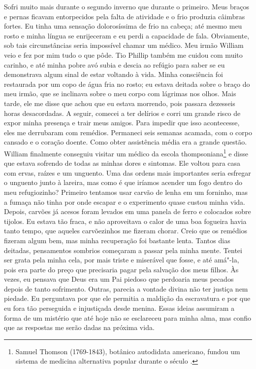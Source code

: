 Sofri muito mais durante o segundo
inverno que durante o primeiro. Meus braços e pernas ficavam
entorpecidos pela falta de atividade e o frio produzia câimbras fortes.
Eu tinha uma sensação dolorosíssima de frio na cabeça; até mesmo meu
rosto e minha língua se enrijeceram e eu perdi a capacidade de fala.
Obviamente, sob tais circunstâncias seria impossível chamar um médico.
Meu irmão William veio e fez por mim tudo o que pôde. Tio Phillip também
me cuidou com muito carinho, e até minha pobre avó subia e descia ao
refúgio para saber se eu demonstrava algum sinal de estar voltando à
vida. Minha consciência foi restaurada por um copo de água fria no
rosto; eu estava deitada sobre o braço do meu irmão, que se inclinava
sobre o meu corpo com lágrimas nos olhos. Mais tarde, ele me disse que
achou que eu estava morrendo, pois passara dezesseis horas desacordadas.
A seguir, comecei a ter delírios e corri um grande risco de expor minha
presença e trair meus amigos. Para impedir que isso acontecesse, eles me
derrubaram com remédios. Permaneci seis semanas acamada, com o corpo
cansado e o coração doente. Como obter assistência média era a grande
questão. William finalmente conseguiu visitar um médico da escola
thompsoniana\footnote{Samuel Thomson (1769-1843), botânico autodidata
  americano, fundou um sistema de medicina alternativa popular durante o
  século .} e disse que estava sofrendo de todas as minhas dores e
sintomas. Ele voltou para casa com ervas, raízes e um unguento. Uma das
ordens mais importantes seria esfregar o unguento junto à lareira, mas
como é que iríamos acender um fogo dentro do meu refugiozinho? Primeiro
tentamos usar carvão de lenha em um forninho, mas a fumaça não tinha por
onde escapar e o experimento quase custou minha vida. Depois, carvões já
acesos foram levados em uma panela de ferro e colocados sobre tijolos.
Eu estava tão fraca, e não aproveitava o calor de uma boa fogueira havia
tanto tempo, que aqueles carvõezinhos me fizeram chorar. Creio que os
remédios fizeram algum bem, mas minha recuperação foi bastante lenta.
Tantos dias deitadas, pensamentos sombrios começaram a passar pela minha
mente. Tentei ser grata pela minha cela, por mais triste e miserável que
fosse, e até amá"-la, pois era parte do preço que precisaria pagar pela
salvação dos meus filhos. Às vezes, eu pensava que Deus era um Pai
piedoso que perdoaria meus pecados depois de tanto sofrimento. Outras,
parecia a vontade divina não ter justiça nem piedade. Eu perguntava por
que ele permitia a maldição da escravatura e por que eu fora tão
perseguida e injustiçada desde menina. Essas ideias assumiram a forma de
um mistério que até hoje não se esclareceu para minha alma, mas confio
que as respostas me serão dadas na próxima vida.

